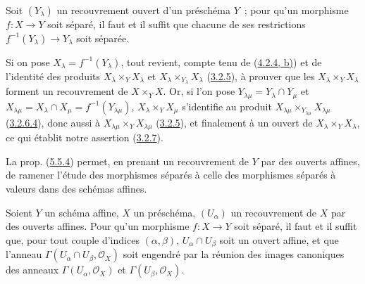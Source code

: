 
\begin{proposition}[5.5.5]
\label{I.5.5.5-fr}
Soit $(Y_\lambda)$ un recouvrement ouvert d'un préschéma $Y$~; pour qu'un
morphisme $f:X\to Y$ soit séparé, il faut et il suffit que chacune de ses
restrictions $f^{-1}(Y_\lambda)\to Y_\lambda$ soit séparée.
\end{proposition}

Si on pose $X_\lambda=f^{-1}(Y_\lambda)$, tout revient, compte tenu de
(\hyperref[I.4.2.4-fr]{4.2.4, b)}) et de l'identité des produits
$X_\lambda\times_Y X_\lambda$ et
$X_\lambda\times_{Y_\lambda}X_\lambda$
(\hyperref[I.3.2.5-fr]{3.2.5}), à prouver que les
$X_\lambda\times_Y X_\lambda$ forment un recouvrement de $X\times_Y X$. Or,
si l'on pose $Y_{\lambda\mu}=Y_\lambda\cap Y_\mu$ et
$X_{\lambda\mu}=X_\lambda\cap X_\mu=f^{-1}(Y_{\lambda\mu})$,
$X_\lambda\times_Y X_\mu$ s'identifie au produit
$X_{\lambda\mu}\times_{Y_{\lambda\mu}}X_{\lambda\mu}$
(\hyperref[I.3.2.6.4-fr]{3.2.6.4}), donc aussi à
$X_{\lambda\mu}\times_Y X_{\lambda\mu}$
(\hyperref[I.3.2.5-fr]{3.2.5}), et finalement à un ouvert de
$X_\lambda\times_Y X_\lambda$, ce qui établit notre assertion
(\hyperref[I.3.2.7-fr]{3.2.7}).

La prop. (\hyperref[I.5.5.4-fr]{5.5.4}) permet, en prenant un recouvrement de
$Y$ par des ouverts affines, de ramener l'étude des morphismes séparés à celle
des morphismes séparés à valeurs dans des schémas affines.

\begin{proposition}[5.5.6]
\label{I.5.5.6-fr}
Soient $Y$ un schéma affine, $X$ un préschéma, $(U_\alpha)$ un recouvrement de
$X$ par des ouverts affines. Pour qu'un morphisme $f:X\to Y$ soit séparé, il
faut et il suffit que, pour tout couple d'indices $(\alpha,\beta)$,
$U_\alpha\cap U_\beta$ soit un ouvert affine, et que l'anneau
$\Gamma(U_\alpha\cap U_\beta,\mathscr{O}_X)$ soit engendré par la réunion des
images canoniques des anneaux $\Gamma(U_\alpha,\mathscr{O}_X)$ et
$\Gamma(U_\beta,\mathscr{O}_X)$.
\end{proposition}

